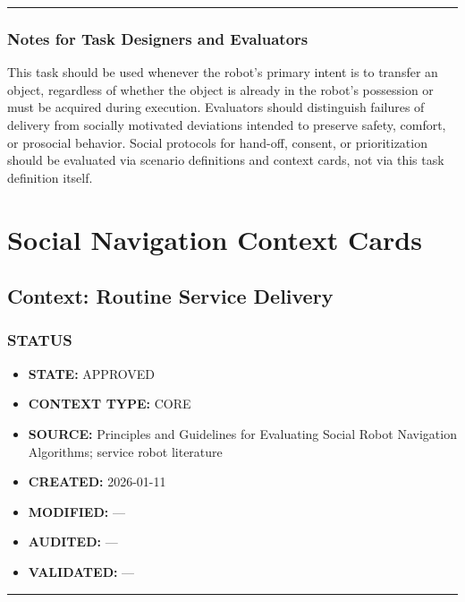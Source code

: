 \documentclass[utf8]{frontiers_suppmat} %
\providecommand{\tightlist}{%
  \setlength{\itemsep}{0pt}\setlength{\parskip}{0pt}}
\begin{document}
\begin{center}\rule{0.5\linewidth}{0.5pt}\end{center}

\subsubsection{Notes for Task Designers and
Evaluators}\label{notes-for-task-designers-and-evaluators}

This task should be used whenever the robot's primary intent is to
transfer an object, regardless of whether the object is already in the
robot's possession or must be acquired during execution. Evaluators
should distinguish failures of delivery from socially motivated
deviations intended to preserve safety, comfort, or prosocial behavior.
Social protocols for hand-off, consent, or prioritization should be
evaluated via scenario definitions and context cards, not via this task
definition itself.


\section{Social Navigation Context Cards}
\subsection{Context: Routine Service
Delivery}\label{context-routine-service-delivery}

\subsubsection{STATUS}\label{status}

\begin{itemize}
\tightlist
\item
  \textbf{STATE:} APPROVED
\item
  \textbf{CONTEXT TYPE:} CORE
\item
  \textbf{SOURCE:} Principles and Guidelines for Evaluating Social Robot
  Navigation Algorithms; service robot literature
\item
  \textbf{CREATED:} 2026-01-11
\item
  \textbf{MODIFIED:} ---
\item
  \textbf{AUDITED:} ---
\item
  \textbf{VALIDATED:} ---
\end{itemize}

\begin{center}\rule{0.5\linewidth}{0.5pt}\end{center}
\end{document}
